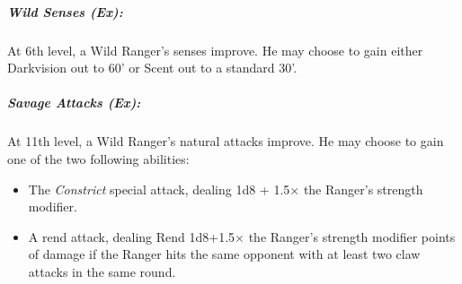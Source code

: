 \subparagraph{Wild Senses (Ex):} At 6th level, a Wild Ranger's senses improve. He may choose to gain either Darkvision out to 60' or Scent out to a standard 30'.

\subparagraph{Savage Attacks (Ex): } At 11th level, a Wild Ranger's natural attacks improve. He may choose to gain one of the two following abilities:
\begin{itemize}
 \item The \emph{Constrict} special attack, dealing 1d8 + 1.5$\times$ the Ranger's strength modifier.
 \item A rend attack, dealing Rend 1d8+1.5$\times$ the Ranger's strength modifier points of damage if the Ranger hits the same opponent with at least two claw attacks in the same round.
\end{itemize}
